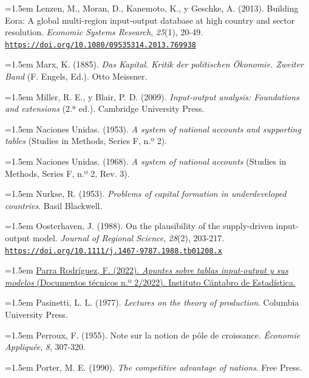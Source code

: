 \documentclass[10pt,a4paper]{article}
\begin{document}
\noindent\hangindent=1.5em Lenzen, M., Moran, D., Kanemoto, K., y Geschke, A. (2013). Building Eora: A global multi-region input-output database at high country and sector resolution. \textit{Economic Systems Research}, \textit{25}(1), 20-49. \href{https://doi.org/10.1080/09535314.2013.769938}{\nolinkurl{https://doi.org/10.1080/09535314.2013.769938}}

\noindent\hangindent=1.5em Marx, K. (1885). \textit{Das Kapital. Kritik der politischen Ökonomie. Zweiter Band} (F. Engels, Ed.). Otto Meissner.

\noindent\hangindent=1.5em Miller, R. E., y Blair, P. D. (2009). \textit{Input-output analysis: Foundations and extensions} (2.ª ed.). Cambridge University Press.

\noindent\hangindent=1.5em Naciones Unidas. (1953). \textit{A system of national accounts and supporting tables} (Studies in Methods, Series F, n.º 2).

\noindent\hangindent=1.5em Naciones Unidas. (1968). \textit{A system of national accounts} (Studies in Methods, Series F, n.º 2, Rev. 3).

\noindent\hangindent=1.5em Nurkse, R. (1953). \textit{Problems of capital formation in underdeveloped countries}. Basil Blackwell.

\noindent\hangindent=1.5em Oosterhaven, J. (1988). On the plausibility of the supply-driven input-output model. \textit{Journal of Regional Science}, \textit{28}(2), 203-217. \href{https://doi.org/10.1111/j.1467-9787.1988.tb01208.x}{\nolinkurl{https://doi.org/10.1111/j.1467-9787.1988.tb01208.x}}

\noindent\hangindent=1.5em \href{https://www.icane.es/documents/32482389/33131571/Apuntes+sobre+tablas+Input-Output+y+sus+Modelos.pdf}{Parra Rodríguez, F. (2022). \textit{Apuntes sobre tablas input-output y sus modelos} (Documentos técnicos n.º 2/2022). Instituto Cántabro de Estadística.}

\noindent\hangindent=1.5em Pasinetti, L. L. (1977). \textit{Lectures on the theory of production}. Columbia University Press.

\noindent\hangindent=1.5em Perroux, F. (1955). Note sur la notion de pôle de croissance. \textit{Économie Appliquée}, \textit{8}, 307-320.

\noindent\hangindent=1.5em Porter, M. E. (1990). \textit{The competitive advantage of nations}. Free Press.
\end{document}
